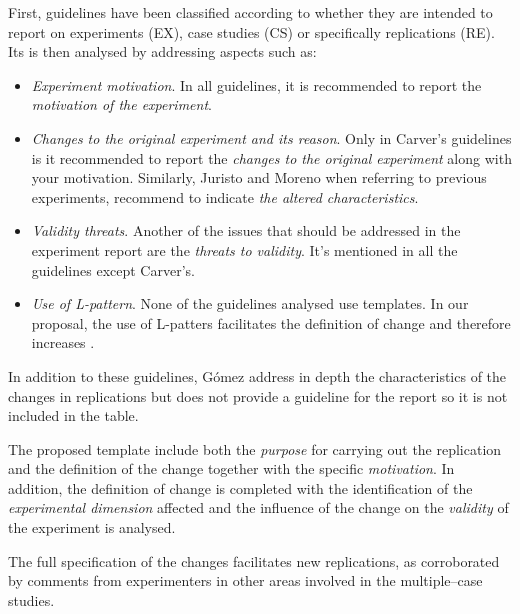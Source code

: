\begin{itemize}
\begin{enumerate}
  

    First, guidelines have been classified according to whether they are intended to report on experiments (EX), case studies (CS) or specifically replications (RE).
    Its \emph{\expressiveness} is then analysed by addressing aspects such as: 

    
    \begin{itemize}
        
	    \item \emph{Experiment motivation}. In all guidelines, it is recommended to report the \emph{motivation of the experiment}. 
	
	    \item \emph{Changes to the original experiment and its reason}. Only in Carver's guidelines \cite{carver2010towards} is it recommended to report the \emph{changes to the original experiment} along with your motivation. Similarly, Juristo and Moreno \cite{juristo2013basics} when referring to previous experiments, recommend to indicate \emph{the altered characteristics}.
	
	    \item \emph{Validity threats}. Another of the issues that should be addressed in the experiment report are the \emph{threats to validity}. It's mentioned in all the guidelines except Carver's.
	    
	    \item \emph{Use of L-pattern}. None of the guidelines analysed use templates. In our proposal, the use of L-patters facilitates the definition of change and therefore increases \emph{\expressiveness}.

    \end{itemize}
    
      
    
    In addition to these guidelines, Gómez \etal \cite{gomez2014understanding} address in depth the characteristics of the changes in replications but does not provide a guideline for the report so it is not included in the table. 
    
    The proposed template include both the \emph{purpose} for carrying out the replication and the definition of the change together with the specific \emph{motivation}.
    In addition, the definition of change is completed with the identification of the \emph{experimental dimension} affected and the influence of the change on the \emph{validity} of the experiment is analysed.
    
    The full specification of the changes facilitates new replications, as corroborated by comments from experimenters in other areas involved in the multiple--case studies.
    

\end{enumerate}
\end{itemize}

